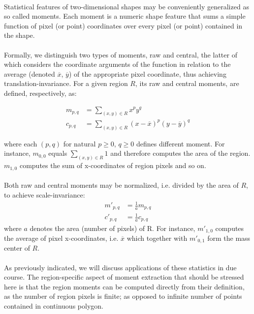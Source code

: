 \paragraph*{}
Statistical features of two-dimensional shapes may be conveniently generalized as so called moments. Each moment is a numeric shape feature that sums a simple function of pixel (or point) coordinates over every pixel (or point) contained in the shape.

\paragraph*{}
Formally, we distinguish two types of moments, raw and central, the latter of which considers the coordinate arguments of the function in relation to the average (denoted $\overline{x}$, $\overline{y}$) of the appropriate pixel coordinate, thus achieving translation-invariance. For a given region $R$, its raw and central moments, are defined, respectively, as:

\begin{align*}
	m_{p,q} &= \sum_{(x,y) \in R} x^p y^q \\
	c_{p,q} &= \sum_{(x,y) \in R} (x-\overline{x})^p (y-\overline{y})^q
\end{align*}

where each $(p,q)$ for natural $p \geq 0$, $q \geq 0$ defines different moment. For instance, $m_{0,0}$ equals $\sum_{(x,y) \in R} 1$ and therefore computes the area of the region. $m_{1,0}$ computes the sum of x-coordinates of region pixels and so on.

\paragraph*{}
Both raw and central moments may be normalized, i.e. divided by the area of $R$, to achieve scale-invariance:
\begin{align*}
	m'_{p,q} &= \frac{1}{a} m_{p,q} \\
	c'_{p,q} &= \frac{1}{a} c_{p,q}
\end{align*}
where $a$ denotes the area (number of pixels) of R. For instance, $m'_{1,0}$ computes the average of pixel x-coordinates, i.e. $\overline{x}$ which together with $m'_{0,1}$ form the mass center of $R$.

\paragraph*{}
As previously indicated, we will discuss applications of these statistics in due course. The region-specific aspect of moment extraction that should be stressed here is that the region moments can be computed directly from their definition, as the number of region pixels is finite; as opposed to infinite number of points contained in continuous polygon.

